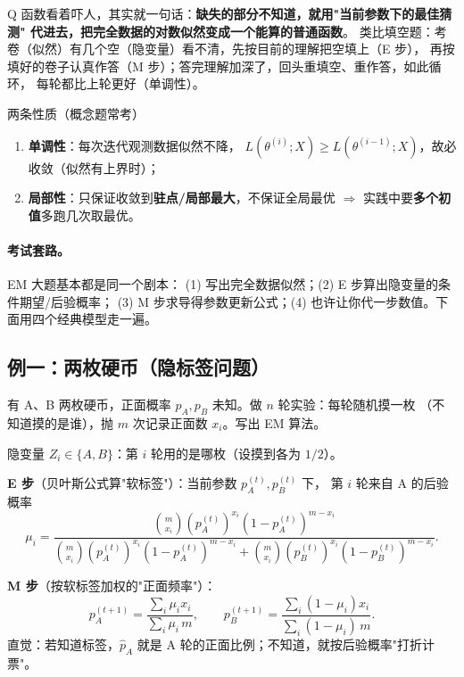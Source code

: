 \begin{pbox}
Q 函数看着吓人，其实就一句话：\textbf{缺失的部分不知道，就用"当前参数下的最佳猜测"
代进去，把完全数据的对数似然变成一个能算的普通函数}。
类比填空题：考卷（似然）有几个空（隐变量）看不清，先按目前的理解把空填上（E 步），
再按填好的卷子认真作答（M 步）；答完理解加深了，回头重填空、重作答，如此循环，
每轮都比上轮更好（单调性）。
\end{pbox}

\begin{kbox}{两条性质（概念题常考）}
\begin{enumerate}[leftmargin=2em]
  \item \textbf{单调性}：每次迭代观测数据似然不降，
  $L(\theta^{(i)};X)\ge L(\theta^{(i-1)};X)$，故必收敛（似然有上界时）；
  \item \textbf{局部性}：只保证收敛到\textbf{驻点/局部最大}，不保证全局最优
  $\Rightarrow$ 实践中要\textbf{多个初值}多跑几次取最优。
\end{enumerate}
\end{kbox}

\paragraph{考试套路。}EM 大题基本都是同一个剧本：
(1) 写出完全数据似然；(2) E 步算出隐变量的条件期望/后验概率；
(3) M 步求导得参数更新公式；(4) 也许让你代一步数值。下面用四个经典模型走一遍。

\subsection{例一：两枚硬币（隐标签问题）}

\begin{exbox}[两硬币模型]
有 A、B 两枚硬币，正面概率 $p_A,p_B$ 未知。做 $n$ 轮实验：每轮随机摸一枚
（不知道摸的是谁），抛 $m$ 次记录正面数 $x_i$。写出 EM 算法。
\end{exbox}
\begin{sol}
隐变量 $Z_i\in\{A,B\}$：第 $i$ 轮用的是哪枚（设摸到各为 $1/2$）。

\textbf{E 步}（贝叶斯公式算"软标签"）：当前参数 $p_A^{(t)},p_B^{(t)}$ 下，
第 $i$ 轮来自 A 的后验概率
\[
\mu_i=\frac{\binom{m}{x_i}(p_A^{(t)})^{x_i}(1-p_A^{(t)})^{m-x_i}}
{\binom{m}{x_i}(p_A^{(t)})^{x_i}(1-p_A^{(t)})^{m-x_i}+\binom{m}{x_i}(p_B^{(t)})^{x_i}(1-p_B^{(t)})^{m-x_i}} .
\]

\textbf{M 步}（按软标签加权的"正面频率"）：
\[
p_A^{(t+1)}=\frac{\sum_i\mu_i x_i}{\sum_i\mu_i\,m},\qquad
p_B^{(t+1)}=\frac{\sum_i(1-\mu_i)x_i}{\sum_i(1-\mu_i)\,m}.
\]
直觉：若知道标签，$\hat p_A$ 就是 A 轮的正面比例；不知道，就按后验概率"打折计票"。
\end{sol}

